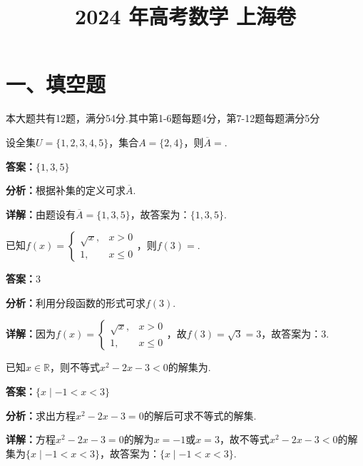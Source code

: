 ﻿\title{2024 年高考数学 上海卷}
\date{}
\maketitle

\section*{一、填空题}
本大题共有12题，满分54分.其中第1-6题每题4分，第7-12题每题满分5分

\begin{question}[points=4]
设全集$U=\{1,2,3,4,5\}$，集合$A=\{2,4\}$，则$\overline{A}=$.
\fillin[{$\{1,3,5\}$}]
\begin{solution}
\textbf{答案：}$\{1,3,5\}$

\textbf{分析：}根据补集的定义可求$\overline{A}$.

\textbf{详解：}由题设有$\overline{A}=\{1,3,5\}$，故答案为：$\{1,3,5\}$.
\end{solution}
\end{question}

\begin{question}[points=4]
已知$f(x)=\begin{cases} \sqrt{x}, & x>0 \\ 1, & x\le 0 \end{cases}$，则$f(3)=$.
\fillin[{$3$}]
\begin{solution}
\textbf{答案：}$3$

\textbf{分析：}利用分段函数的形式可求$f(3)$.

\textbf{详解：}因为$f(x)=\begin{cases} \sqrt{x}, & x>0 \\ 1, & x\le 0 \end{cases}$，故$f(3)=\sqrt{3}=3$，故答案为：$3$.
\end{solution}
\end{question}

\begin{question}[points=4]
已知$x\in\mathbb{R}$，则不等式$x^2-2x-3<0$的解集为.
\fillin[{$\{x\mid -1<x<3\}$}]
\begin{solution}
\textbf{答案：}$\{x\mid -1<x<3\}$

\textbf{分析：}求出方程$x^2-2x-3=0$的解后可求不等式的解集.

\textbf{详解：}方程$x^2-2x-3=0$的解为$x=-1$或$x=3$，故不等式$x^2-2x-3<0$的解集为$\{x\mid -1<x<3\}$，故答案为：$\{x\mid -1<x<3\}$.
\end{solution}
\end{question}


